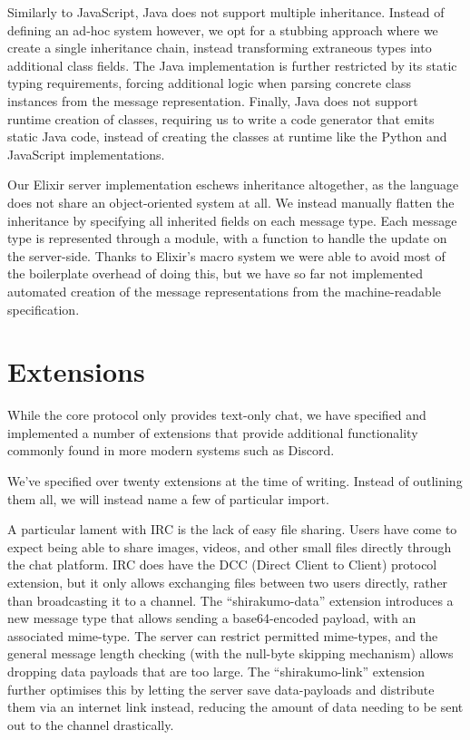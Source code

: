 \documentclass[format=sigconf]{acmart}
\begin{document}
Similarly to JavaScript, Java does not support multiple inheritance. Instead of defining an ad-hoc system however, we opt for a stubbing approach where we create a single inheritance chain, instead transforming extraneous types into additional class fields. The Java implementation is further restricted by its static typing requirements, forcing additional logic when parsing concrete class instances from the message representation. Finally, Java does not support runtime creation of classes, requiring us to write a code generator that emits static Java code, instead of creating the classes at runtime like the Python and JavaScript implementations.

Our Elixir server implementation eschews inheritance altogether, as the language does not share an object-oriented system at all. We instead manually flatten the inheritance by specifying all inherited fields on each message type. Each message type is represented through a module, with a function to handle the update on the server-side. Thanks to Elixir's macro system we were able to avoid most of the boilerplate overhead of doing this, but we have so far not implemented automated creation of the message representations from the machine-readable specification.

\section{Extensions}\label{extensions}
While the core protocol only provides text-only chat, we have specified and implemented a number of extensions that provide additional functionality commonly found in more modern systems such as Discord.

We've specified over twenty extensions at the time of writing. Instead of outlining them all, we will instead name a few of particular import.

A particular lament with IRC is the lack of easy file sharing. Users have come to expect being able to share images, videos, and other small files directly through the chat platform. IRC does have the DCC (Direct Client to Client) protocol extension, but it only allows exchanging files between two users directly, rather than broadcasting it to a channel. The ``shirakumo-data'' extension introduces a new message type that allows sending a base64-encoded payload, with an associated mime-type. The server can restrict permitted mime-types, and the general message length checking (with the null-byte skipping mechanism) allows dropping data payloads that are too large. The ``shirakumo-link'' extension further optimises this by letting the server save data-payloads and distribute them via an internet link instead, reducing the amount of data needing to be sent out to the channel drastically.
\end{document}
